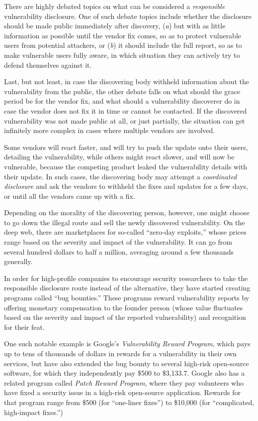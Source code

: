 \documentclass[a4paper,12pt]{article}
\begin{document}
	There are highly debated topics on what can be considered a \textit{responsible} vulnerability disclosure. One of such debate topics include whether the disclosure should be made public immediately after discovery, (\textit{a}) but with as little information as possible until the vendor fix comes, so as to protect vulnerable users from potential attackers, or (\textit{b}) it should include the full report, so as to make vulnerable users fully aware, in which situation they can actively try to defend themselves against it. 
	
	Last, but not least, in case the discovering body withheld information about the vulnerability from the public, the other debate falls on what should the grace period be for the vendor fix, and what should a vulnerability discoverer do in case the vendor does not fix it in time or cannot be contacted. If the discovered vulnerability was not made public at all, or just partially, the situation can get infinitely more complex in cases where multiple vendors are involved.
	
	Some vendors will react faster, and will try to push the update onto their users, detailing the vulnerability, while others might react slower, and will now be vulnerable, because the competing product leaked the vulnerability details with their update. In such cases, the discovering body may attempt a \textit{coordinated disclosure} and ask the vendors to withheld the fixes and updates for a few days, or until all the vendors came up with a fix.
	
	Depending on the morality of the discovering person, however, one might choose to go down the illegal route and sell the newly discovered vulnerability. On the deep web, there are marketplaces for so-called ``zero-day exploits,'' whose prices range based on the severity and impact of the vulnerability. It can go from several hundred dollars to half a million, averaging around a few thousands generally\cite{nperlroth13}.
	
	In order for high-profile companies to encourage security researchers to take the responsible disclosure route instead of the alternative, they have started creating programs called ``bug bounties.'' These programs reward vulnerability reports by offering monetary compensation to the founder person (whose value fluctuates based on the severity and impact of the reported vulnerability) and recognition for their feat.
	
	One such notable example is Google's \textit{Vulnerability Reward Program}\cite{googlevrp15}, which pays up to tens of thousands of dollars in rewards for a vulnerability in their own services, but have also extended the bug bounty to several high-risk open-source software, for which they independently pay \$500 to \$3,133.7. Google also has a related program called \textit{Patch Reward Program}, where they pay volunteers who have fixed a security issue in a high-risk open-source application. Rewards for that program range from \$500 (for ``one-liner fixes'') to \$10,000 (for ``complicated, high-impact fixes.'')
	
\end{document}
